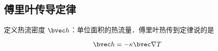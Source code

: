 
\subsection{傅里叶传导定律}
定义热流密度 $\bvec h$：单位面积的热流量．傅里叶热传到定律说的是

\begin{equation}
\bvec h = -\kappa \bvec \nabla T
\end{equation}